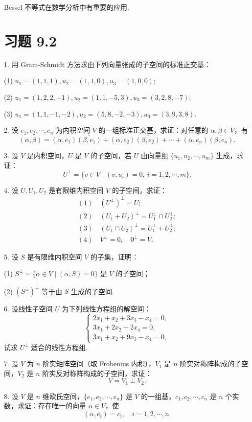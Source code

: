 \documentclass[UTF8,12pt,a4paper,fontset=fandol]{ctexart}
\begin{document}
Bessel 不等式在数学分析中有重要的应用.

\section*{习题 9.2}

1. 用 Gram-Schmidt 方法求由下列向量张成的子空间的标准正交基：

(1) $u_1=(1,1,1),u_2=(1,1,0),u_3=(1,0,0)$;

(2) $u_1=(1,2,2,-1),u_2=(1,1,-5,3),u_3=(3,2,8,-7)$;

(3) $u_1=(1,1,-1,-2),u_2=(5,8,-2,-3),u_3=(3,9,3,8)$.

2. 设 $e_1,e_2,\cdots,e_n$ 为内积空间 $V$ 的一组标准正交基，求证：对任意的 $\alpha,\beta\in V$，有
\[
  (\alpha,\beta)=(\alpha,e_1)\overline{(\beta,e_1)}
  +(\alpha,e_2)\overline{(\beta,e_2)}
  +\cdots
  +(\alpha,e_n)\overline{(\beta,e_n)}.
\]

3. 设 $V$ 是内积空间，$U$ 是 $V$ 的子空间，若 $U$ 由向量组 $\{u_1,u_2,\cdots,u_m\}$ 生成，求证：
\[
  U^\perp=\{v\in V\mid (v,u_i)=0,\ i=1,2,\cdots,m\}.
\]

4. 设 $U,U_1,U_2$ 是有限维内积空间 $V$ 的子空间，求证：
\[
\begin{gathered}
  (1)\quad (U^\perp)^\perp=U;\\
  (2)\quad (U_1+U_2)^\perp=U_1^\perp\cap U_2^\perp;\\
  (3)\quad (U_1\cap U_2)^\perp=U_1^\perp+U_2^\perp;\\
  (4)\quad V^\perp=0,\quad 0^\perp=V.
\end{gathered}
\]

5. 设 $S$ 是有限维内积空间 $V$ 的子集，证明：

(1) $S^\perp=\{\alpha\in V\mid (\alpha,S)=0\}$ 是 $V$ 的子空间；

(2) $(S^\perp)^\perp$ 等于由 $S$ 生成的子空间.

6. 设线性子空间 $U$ 为下列线性方程组的解空间：
\[
  \begin{cases}
    2x_1+x_2+3x_3-x_4=0,\\
    3x_1+2x_2-2x_4=0,\\
    3x_1+x_2+9x_3-x_4=0,
  \end{cases}
\]
试求 $U^\perp$ 适合的线性方程组.

7. 设 $V$ 为 $n$ 阶实矩阵空间（取 Frobenius 内积），$V_1$ 是 $n$ 阶实对称阵构成的子空间，$V_2$ 是 $n$ 阶实反对称阵构成的子空间，求证：
\[
  V=V_1\perp V_2.
\]

8. 设 $V$ 是 $n$ 维欧氏空间，$\{e_1,e_2,\cdots,e_n\}$ 是 $V$ 的一组基，$c_1,c_2,\cdots,c_n$ 是 $n$ 个实数，求证：存在唯一的向量 $\alpha\in V$，使
\[
  (\alpha,e_i)=c_i,\quad i=1,2,\cdots,n.
\]
\end{document}
